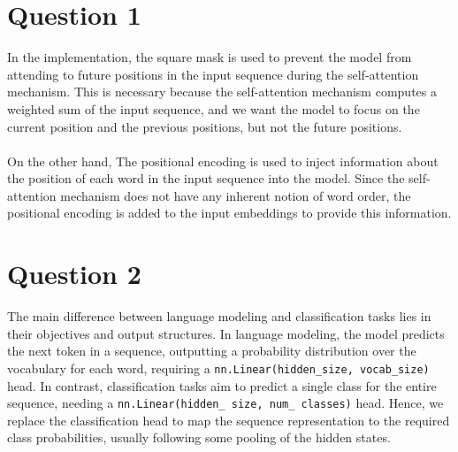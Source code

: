 \documentclass[a4paper]{article}
\begin{document}



\section*{Question 1}
In the implementation, the square mask is used to prevent the model from attending
to future positions in the input sequence during the self-attention mechanism. This is
necessary because the self-attention mechanism computes a weighted sum of the input sequence,
and we want the model to focus on the current position and the previous positions, but not
the future positions.
\\
\\
On the other hand, The positional encoding is used to inject information about the position
of each word in the input sequence into the model. Since the self-attention mechanism
does not have any inherent notion of word order, the positional encoding is added to
the input embeddings to provide this information.

\section*{Question 2}
The main difference between language modeling and classification tasks lies in
their objectives and output structures. In language modeling, the model predicts the
next token in a sequence, outputting a probability distribution over the vocabulary
for each word, requiring a \texttt{nn.Linear(hidden\_size, vocab\_size)} head. In contrast,
classification tasks aim to predict a single class for the entire sequence, needing
a \texttt{nn.Linear(hidden\_ size, num\_ classes)} head. Hence, we
replace the classification head to map the sequence representation to the required
class probabilities, usually following some pooling of the hidden states.
\end{document}
